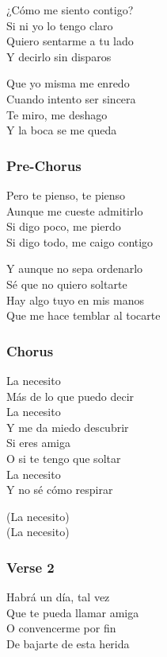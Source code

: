 \documentclass[]{article}
\begin{document}
¿Cómo me siento contigo?\\
Si ni yo lo tengo claro\\
Quiero sentarme a tu lado\\
Y decirlo sin disparos

Que yo misma me enredo\\
Cuando intento ser sincera\\
Te miro, me deshago\\
Y la boca se me queda

\subsubsection{Pre-Chorus}\label{pre-chorus-22}

Pero te pienso, te pienso\\
Aunque me cueste admitirlo\\
Si digo poco, me pierdo\\
Si digo todo, me caigo contigo

Y aunque no sepa ordenarlo\\
Sé que no quiero soltarte\\
Hay algo tuyo en mis manos\\
Que me hace temblar al tocarte

\subsubsection{Chorus}\label{chorus-38}

La necesito\\
Más de lo que puedo decir\\
La necesito\\
Y me da miedo descubrir\\
Si eres amiga\\
O si te tengo que soltar\\
La necesito\\
Y no sé cómo respirar

(La necesito)\\
(La necesito)

\subsubsection{Verse 2}\label{verse-2-11}

Habrá un día, tal vez\\
Que te pueda llamar amiga\\
O convencerme por fin\\
De bajarte de esta herida
\end{document}
